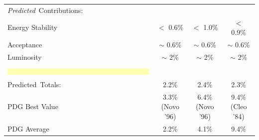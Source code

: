 \begin{minipage}{6in}
\begin{minipage}{\linewidth}
\begin{tabular}{p{4.5cm} c c c}
    \mbox{\LARGE {\it Predicted} Contributions:} & & & \vspace{0.2cm} \vspace{0.1cm} \\
    Energy Stability & $<$ 0.6\% & $<$ 1.0\% & $<$ 0.9\% \vspace{0.1cm} \\
    Acceptance & $\sim$ 0.6\% & $\sim$ 0.6\% & $\sim$ 0.6\% \vspace{0.1cm} \\
    Luminosity & $\sim$ 2\% & $\sim$ 2\% & $\sim$ 2\% \vspace{0.25cm} \vspace{0.1cm} \\\hline
    & & & \vspace{-0.35cm} \vspace{0.1cm} \\

    \mbox{\hspace{-0.1cm}\includegraphics[width=15.5cm]{pivarski3.eps}} & & & \vspace{-0.9cm} \vspace{0.1cm} \\
    \mbox{\LARGE Predicted Totals:} & \mbox{2.2\%} & \mbox{2.4\%} & \mbox{2.3\%} \vspace{0.5cm} \vspace{0.1cm} \\

    PDG Best Value
    & \hspace{1.15cm} 3.3\% {\small ({\sc Novo} '96)} \hspace{-0.90cm} 
    & \hspace{1.15cm} 6.4\% {\small ({\sc Novo} '96)} \hspace{-0.90cm} 
    & \hspace{1.15cm} 9.4\% {\small ({\sc Cleo} '84)} \hspace{-0.90cm} \vspace{0.1cm} \\
    PDG Average & 2.2\% & 4.1\% & 9.4\% \\

  \end{tabular}
\end{minipage}

\end{minipage}

\newpage

